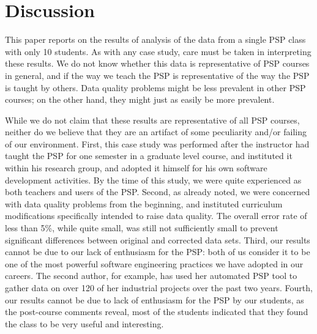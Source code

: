
\section{Discussion}
\label{sec:discussion}

This paper reports on the results of analysis of the data from a single PSP 
class with only 10 students.  As with any case study, care must be taken
in interpreting these results.  We do not know whether this data is 
representative of PSP courses in general, and if the way we teach the
PSP is representative of the way the PSP is taught by others. Data quality
problems might be less prevalent in other PSP courses; on the other hand,
they might just as easily be more prevalent.

While we do not claim that these results are representative of all PSP
courses, neither do we believe that they are an artifact of some peculiarity
and/or failing of our environment.  First, this case study was performed
after the instructor had taught the PSP for one semester in a graduate
level course, and instituted it within his research group, and adopted it
himself for his own software development activities.  By the time of this
study, we were quite experienced as both teachers and users of the PSP.
Second, as already noted, we were concerned with data quality problems from
the beginning, and instituted curriculum modifications specifically
intended to raise data quality. The overall error rate of less than 5\%,
while quite small, was still not sufficiently small to prevent significant
differences between original and corrected data sets. Third, our results cannot
be due to our lack of enthusiasm for the PSP: both of us consider it to be
one of the most powerful software engineering practices we have adopted in
our careers.  The second author, for example, has used her automated PSP
tool to gather data on over 120 of her industrial projects over the past
two years.  Fourth, our results cannot be due to lack of enthusiasm for the
PSP by our students, as the post-course comments reveal, most of the
students indicated that they found the class to be very useful and
interesting.

